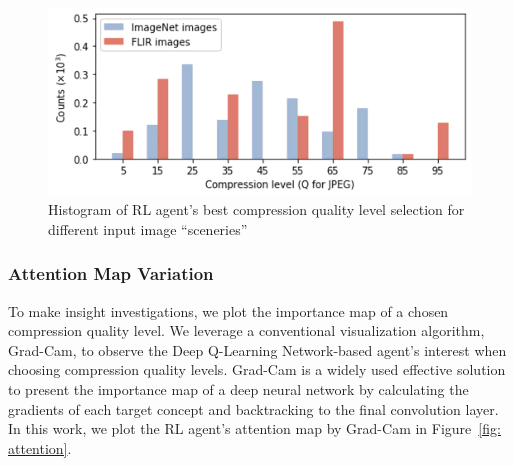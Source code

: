
\begin{figure}[htbp]
	\includegraphics[width=\linewidth]{figures/dataset_change.pdf}
	\caption{Histogram of RL agent's best compression quality level selection for different input image ``sceneries''}
	\label{fig: dataset_change}
\end{figure}

\subsubsection{Attention Map Variation}
\label{subsec: attention map}

To make insight investigations, we plot the importance map of a chosen compression quality level. We leverage a conventional visualization algorithm, Grad-Cam, to observe the Deep Q-Learning Network-based agent's interest when choosing compression quality levels. Grad-Cam is a widely used effective solution to present the importance map of a deep neural network by calculating the gradients of each target concept and backtracking to the final convolution layer. In this work, we plot the RL agent's attention map by Grad-Cam in Figure~\ref{fig: attention}. %

